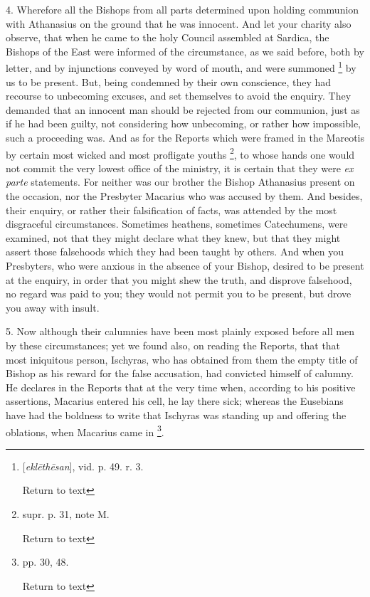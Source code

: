 4. Wherefore all the Bishops from all parts
determined upon holding communion with Athanasius on the ground that
he was innocent. And let your charity also observe, that when he
came to the holy Council assembled at Sardica, the Bishops of the East
were informed of the circumstance, as we said before, both by letter,
and by injunctions conveyed by word of mouth, and were summoned \footnote{[\emph{ekl\={e}th\={e}san}], vid. p.
49. r. 3.

Return to text} by us to be present. But, being condemned by their own conscience,
they had recourse to unbecoming excuses, and set themselves to avoid
the enquiry. They demanded that an innocent man should be rejected
from our communion, just as if he had been guilty, not considering how
unbecoming, or rather how impossible, such a proceeding was. And as
for the Reports which were framed in the Mareotis by certain most
wicked and most profligate youths \footnote{supr. p. 31, note M.

Return to text}, to whose hands one would
not commit the very lowest office of the ministry, it is certain that
they were \emph{ex parte} statements. For neither was our brother the
Bishop Athanasius present on the occasion, nor the Presbyter Macarius
who was accused by them. And besides, their enquiry, or rather their
falsification of facts, was attended by the most disgraceful
circumstances. Sometimes heathens, sometimes Catechumens, were
examined, not that they might declare what they knew, but that they
might assert those falsehoods which they had been taught by others.
And when you Presbyters, who were anxious in the absence of your
Bishop, desired to be present at the enquiry, in order that you might
shew the truth, and disprove falsehood, no regard was paid to you;
they would not permit you to be present, but drove you away with
insult.

5. Now although their calumnies have been most
plainly exposed before all men by these circumstances; yet we found
also, on reading the Reports, that that most iniquitous person,
Ischyras, who has obtained from them the empty title of Bishop as his
reward for the false accusation, had convicted himself of calumny. He
declares in the Reports that at the very time when, according to his
positive assertions, Macarius entered his cell, he lay there sick;
whereas the Eusebians have had the boldness to write that Ischyras was
standing up and offering the oblations, when Macarius came in \footnote{pp. 30, 48.

Return to text}.


